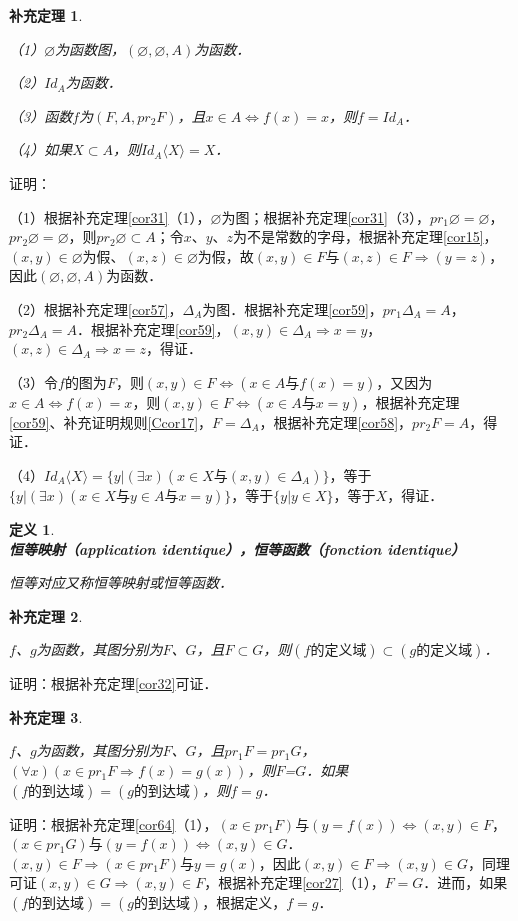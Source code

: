 \documentclass[12pt, a4paper, oneside]{book}
\newtheorem{cor}{补充定理}
\newtheorem{de}{定义}
\begin{document}
			\begin{cor}\label{cor66}
				\hfill\par
				（1）$\varnothing$为函数图，$(\varnothing, \varnothing, A)$为函数．
				\par
				（2）$Id_A$为函数．
				\par
				（3）函数$f$为$(F, A, pr_2F)$，且$x\in A\Leftrightarrow f(x)=x$，则$f=Id_A$．
				\par
				（4）如果$X\subset A$，则$Id_A\langle X \rangle =X$．
			\end{cor}
			证明：
			\par
			（1）根据补充定理\ref{cor31}（1），$\varnothing$为图；根据补充定理\ref{cor31}（3），$pr_1\varnothing= \varnothing$，$pr_2\varnothing= \varnothing$，则$pr_2\varnothing\subset A$；令$x$、$y$、$z$为不是常数的字母，根据补充定理\ref{cor15}，$(x, y)\in \varnothing$为假、$(x, z)\in \varnothing$为假，故$(x, y)\in F\text{与}(x, z)\in F\Rightarrow (y=z)$，因此$(\varnothing, \varnothing, A)$为函数．
			\par
			（2）根据补充定理\ref{cor57}，$\Delta_A$为图．根据补充定理\ref{cor59}，$pr_1\Delta_A=A$，$pr_2\Delta_A=A$．根据补充定理\ref{cor59}，$(x, y)\in \Delta_A\Rightarrow x=y$，$(x, z)\in \Delta_A\Rightarrow x=z$，得证．
			\par
			（3）令$f$的图为$F$，则$(x, y)\in F\Leftrightarrow (x\in A\text{与}f(x)=y)$，又因为$x\in A\Leftrightarrow f(x)=x$，则$(x, y)\in F\Leftrightarrow (x\in A\text{与}x=y)$，根据补充定理\ref{cor59}、补充证明规则\ref{Ccor17}，$F=\Delta_A$，根据补充定理\ref{cor58}，$pr_2F=A$，得证．
			\par
			（4）$Id_A\langle X \rangle =\{y|(\exists x)(x\in X\text{与}(x, y)\in \Delta_A)\}$，等于$\{y|(\exists x)(x\in X\text{与}y\in A\text{与}x=y)\}$，等于$\{y|y\in X\}$，等于$X$，得证．			

			\begin{de}
				\textbf{恒等映射（application identique），恒等函数（fonction identique）}
				\par
				恒等对应又称恒等映射或恒等函数．
			\end{de}
			
			\begin{cor}\label{cor67}
				\hfill\par
				$f$、$g$为函数，其图分别为$F$、$G$，且$F\subset G$，则$(f\text{的定义域})\subset (g\text{的定义域})$．
			\end{cor}
			证明：根据补充定理\ref{cor32}可证．
			
			\begin{cor}\label{cor68}
				\hfill\par
				$f$、$g$为函数，其图分别为$F$、$G$，且$pr_1F=pr_1G$，$(\forall x)(x\in pr_1F\Rightarrow f(x)=g(x))$，则$F$=$G$．如果$(f\text{的到达域})=(g\text{的到达域})$，则$f=g$．
			\end{cor}
			证明：根据补充定理\ref{cor64}（1），$(x\in pr_1F)\text{与}(y=f(x))\Leftrightarrow (x, y)\in F$，$(x\in pr_1G)\text{与}(y=f(x))\Leftrightarrow (x, y)\in G$．$(x, y)\in F\Rightarrow (x\in pr_1F)\text{与}y=g(x)$，因此$(x, y)\in F\Rightarrow (x, y)\in G$，同理可证$(x, y)\in G\Rightarrow (x, y)\in F$，根据补充定理\ref{cor27}（1），$F=G$．进而，如果$(f\text{的到达域})=(g\text{的到达域})$，根据定义，$f=g$．
			
\end{document}

